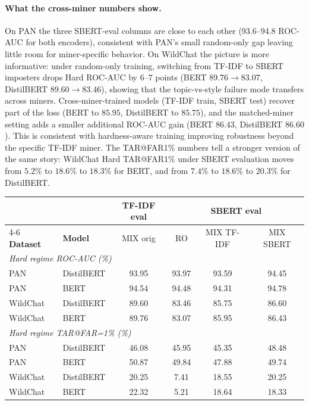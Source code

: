 \documentclass[11pt]{article}
\renewcommand{\arraystretch}{1.05}
\begin{document}
\paragraph{What the cross-miner numbers show.} On PAN the three SBERT-eval columns are close to each other (93.6--94.8 ROC-AUC for both encoders), consistent with PAN's small random-only gap leaving little room for miner-specific behavior. On WildChat the picture is more informative: under random-only training, switching from TF-IDF to SBERT imposters drops Hard ROC-AUC by 6--7 points (BERT $89.76 \to 83.07$, DistilBERT $89.60 \to 83.46$), showing that the topic-vs-style failure mode transfers across miners. Cross-miner-trained models (TF-IDF train, SBERT test) recover part of the loss (BERT to $85.95$, DistilBERT to $85.75$), and the matched-miner setting adds a smaller additional ROC-AUC gain (BERT $86.43$, DistilBERT $86.60$). This is consistent with hardness-aware training improving robustness beyond the specific TF-IDF miner. The TAR@FAR1\% numbers tell a stronger version of the same story: WildChat Hard TAR@FAR1\% under SBERT evaluation moves from $5.2\%$ to $18.6\%$ to $18.3\%$ for BERT, and from $7.4\%$ to $18.6\%$ to $20.3\%$ for DistilBERT.
\columnbreak
\begingroup
\renewcommand{\arraystretch}{0.78}
\setlength{\tabcolsep}{2pt}
\captionsetup{skip=1pt}
\vspace{-0.3em}
\begin{center}
\begin{minipage}{0.98\columnwidth}
\centering
\tiny
\begin{tabular}{l l c c c c}
\toprule
& & \textbf{TF-IDF eval} & \multicolumn{3}{c}{\textbf{SBERT eval}} \\
\cmidrule(lr){4-6}
\textbf{Dataset} & \textbf{Model} & MIX orig & RO & MIX TF-IDF & MIX SBERT \\
\midrule
\multicolumn{6}{l}{\textit{Hard regime ROC-AUC (\%)}} \\
PAN      & DistilBERT  & 93.95 & 93.97 & 93.59 & 94.45 \\
PAN      & BERT        & 94.54 & 94.48 & 94.31 & 94.78 \\
WildChat & DistilBERT  & 89.60 & 83.46 & 85.75 & 86.60 \\
WildChat & BERT        & 89.76 & 83.07 & 85.95 & 86.43 \\
\midrule
\multicolumn{6}{l}{\textit{Hard regime TAR@FAR=1\% (\%)}} \\
PAN      & DistilBERT  & 46.08 & 45.95 & 45.35 & 48.48 \\
PAN      & BERT        & 50.87 & 49.84 & 47.88 & 49.74 \\
WildChat & DistilBERT  & 20.25 & \phantom{0}7.41 & 18.55 & 20.25 \\
WildChat & BERT        & 22.32 & \phantom{0}5.21 & 18.64 & 18.33 \\
\bottomrule
\end{tabular}
\label{tab:app_sbert_summary}
\end{minipage}
\end{center}
\endgroup
\end{document}
